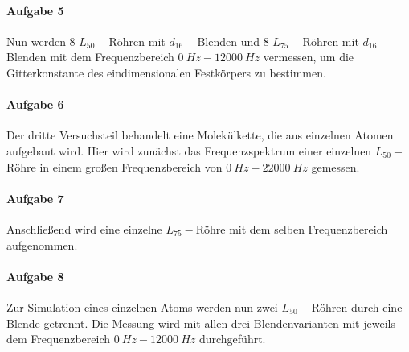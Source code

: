 \paragraph{Aufgabe 5}
Nun werden 8 $L_{50}-$Röhren mit $d_{16}-$Blenden und 8 $L_{75}-$Röhren mit $d_{16}-$Blenden mit dem Frequenzbereich $\SI{0}{Hz}-\SI{12000}{Hz}$ vermessen, um die Gitterkonstante des eindimensionalen Festkörpers zu bestimmen.\\
%
\paragraph{Aufgabe 6}
Der dritte Versuchsteil behandelt eine Molekülkette, die aus einzelnen Atomen aufgebaut wird.
Hier wird zunächst das Frequenzspektrum einer einzelnen $L_{50}-$Röhre in einem großen Frequenzbereich von $\SI{0}{Hz}-\SI{22000}{Hz}$ gemessen.\\
%
\paragraph{Aufgabe 7}
Anschließend wird eine einzelne $L_{75}-$Röhre mit dem selben Frequenzbereich aufgenommen.\\
%
\paragraph{Aufgabe 8}
Zur Simulation eines einzelnen Atoms werden nun zwei $L_{50}-$Röhren durch eine Blende getrennt.
Die Messung wird mit allen drei Blendenvarianten mit jeweils dem Frequenzbereich $\SI{0}{Hz}-\SI{12000}{Hz}$ durchgeführt.\\
%
